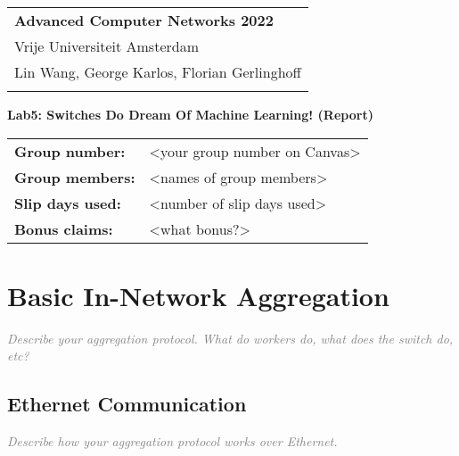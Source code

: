 \documentclass[a4paper,11pt]{article}
\newcommand{\note}[1]{\textit{\textcolor{gray}{#1}}}
\begin{document}
\thispagestyle{empty} 

\begin{tabular}{@{}p{15.5cm}} 
{\bf Advanced Computer Networks 2022} \\
Vrije Universiteit Amsterdam  \\ Lin Wang, George Karlos, Florian Gerlinghoff\\
\hline 
\\
\end{tabular} 

\vspace*{0.3cm} 

{\Large \bf Lab5: Switches Do Dream Of Machine Learning! (Report)} 

\vspace*{0.3cm} 


\begin{tcolorbox}[sharp corners, colback=blue!5!white]
\begin{tabular}{@{}ll}
\textbf{Group number:} & <your group number on Canvas> \\
\textbf{Group members:} & <names of group members> \\
\textbf{Slip days used:} & <number of slip days used> \\
\textbf{Bonus claims:} & <what bonus?> \\
\end{tabular}
\end{tcolorbox}

\vspace{0.4cm}

\section{Basic In-Network Aggregation}

\note{Describe your aggregation protocol. What do workers do, what does the switch do, etc?}

\subsection{Ethernet Communication}

\note{Describe how your aggregation protocol works over Ethernet.}
\end{document}
